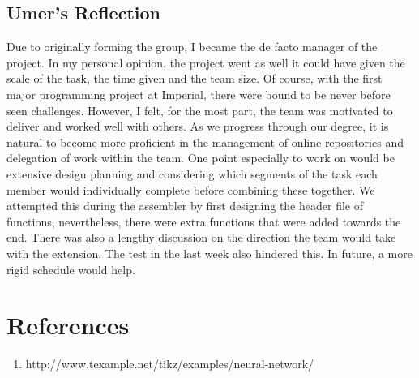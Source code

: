 \documentclass[11pt]{article}
\begin{document}
\subsection{Umer's Reflection}
Due to originally forming the group, I became the de facto manager of the project. In my personal opinion, the project went as well it could have given the scale of the task, the time given and the team size. Of course, with the first major programming project at Imperial, there were bound to be never before seen challenges. However, I felt, for the most part, the team was motivated to deliver and worked well with others. As we progress through our degree, it is natural to become more proficient in the management of online repositories and delegation of work within the team. One point especially to work on would be extensive design planning and considering which segments of the task each member would individually complete before combining these together. We attempted this during the assembler by first designing the header file of functions, nevertheless, there were extra functions that were added towards the end. There was also a lengthy discussion on the direction the team would take with the extension. The test in the last week also hindered this. In future, a more rigid schedule would help.

\section{References}
\begin{enumerate}
    \item http://www.texample.net/tikz/examples/neural-network/
\end{enumerate}
\end{document}
